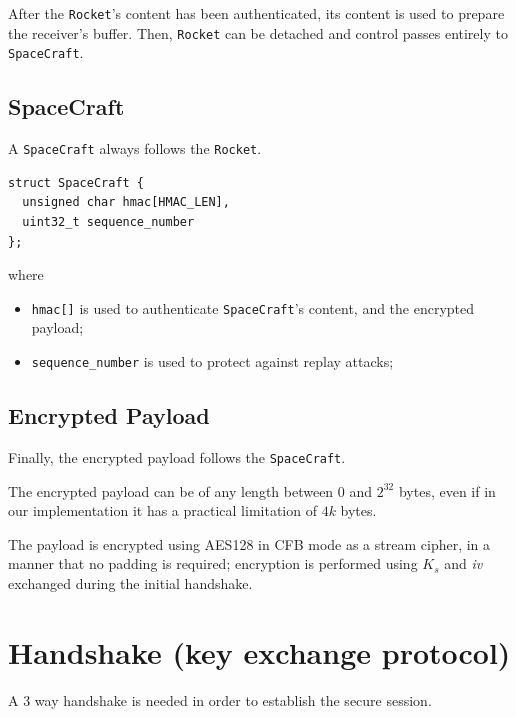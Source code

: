 \documentclass[a4paper,12pt]{article}
\begin{document}
After the \texttt{Rocket}'s content has been authenticated, its content is used to prepare the receiver's buffer.
Then, \texttt{Rocket} can be detached and control passes entirely to \texttt{SpaceCraft}.

\subsection{SpaceCraft}
A \texttt{SpaceCraft} always follows the \texttt{Rocket}.

\begin{verbatim}
struct SpaceCraft {
  unsigned char hmac[HMAC_LEN],
  uint32_t sequence_number
};
\end{verbatim}

where

\begin{itemize}
  \item \texttt{hmac[]} is used to authenticate \texttt{SpaceCraft}'s content, and the encrypted payload;
  \item \texttt{sequence\_number} is used to protect against replay attacks;
\end{itemize}

\subsection{Encrypted Payload}
Finally, the encrypted payload follows the \texttt{SpaceCraft}.

The encrypted payload can be of any length between $0$ and $2^{32}$ bytes, even if in our implementation it has a practical limitation of $4k$ bytes.

The payload is encrypted using AES128 in CFB mode as a stream cipher, in a manner that no padding is required;
encryption is performed using $K_s$ and \emph{iv} exchanged during the initial handshake.

\section{Handshake (key exchange protocol)}
A 3 way handshake is needed in order to establish the secure session.
\end{document}
